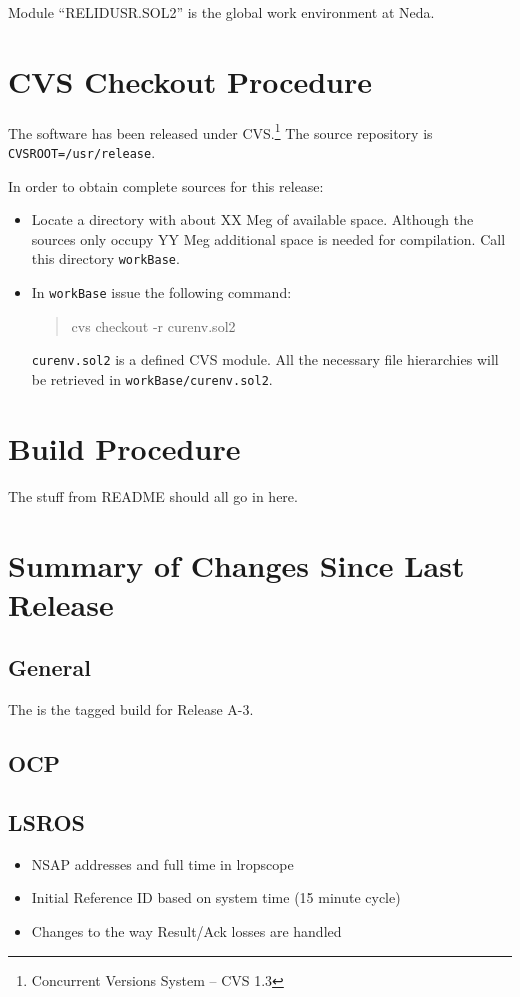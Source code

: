 Module ``RELIDUSR.SOL2'' is the global work environment at Neda.

\section*{CVS Checkout Procedure}

The software has been released under CVS.\footnote{Concurrent Versions
System -- CVS 1.3} The source repository is {\tt
CVSROOT=/usr/release}. 

In order to obtain complete sources for this release:
\begin{itemize}
\item Locate a directory with about XX Meg of available space.
  Although the sources only occupy YY Meg additional space is needed
  for compilation. Call this directory {\tt workBase}.
\item In {\tt workBase} issue the following command:
  \begin{quote}
    cvs checkout -r \RCSName curenv.sol2 
  \end{quote}
  {\tt curenv.sol2} is a defined CVS module.
  All the necessary file hierarchies will be
  retrieved in {\tt workBase/curenv.sol2}.
\end{itemize}

\section*{Build Procedure}

The stuff from README should all go in here.

\section*{Summary of Changes Since Last Release}

\subsection*{General}

The is the tagged build for Release A-3.

\subsection*{OCP}

\subsection*{LSROS}
\begin{itemize}
\item NSAP addresses and full time in lropscope
\item Initial Reference ID based on system time (15 minute cycle)
\item Changes to the way Result/Ack losses are handled
\end{itemize}

